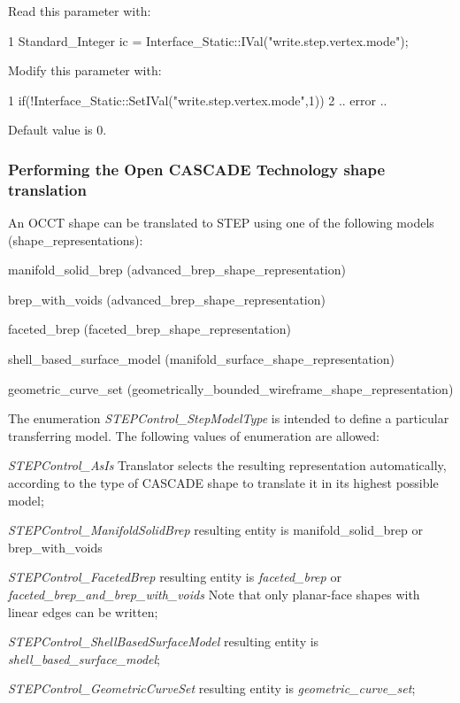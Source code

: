Read this parameter with\+: 
\begin{DoxyCode}
1 Standard\_Integer ic = Interface\_Static::IVal("write.step.vertex.mode"); 
\end{DoxyCode}
 Modify this parameter with\+: 
\begin{DoxyCode}
1 if(!Interface\_Static::SetIVal("write.step.vertex.mode",1))  
2 .. error .. 
\end{DoxyCode}
 Default value is 0.\hypertarget{occt_user_guides__step_occt_step_3_3_3}{}\subsubsection{Performing the Open C\+A\+S\+C\+A\+D\+E Technology shape translation}\label{occt_user_guides__step_occt_step_3_3_3}
An O\+C\+CT shape can be translated to S\+T\+EP using one of the following models (shape\+\_\+representations)\+:
\begin{DoxyItemize}
\item manifold\+\_\+solid\+\_\+brep (advanced\+\_\+brep\+\_\+shape\+\_\+representation)
\item brep\+\_\+with\+\_\+voids (advanced\+\_\+brep\+\_\+shape\+\_\+representation)
\item faceted\+\_\+brep (faceted\+\_\+brep\+\_\+shape\+\_\+representation)
\item shell\+\_\+based\+\_\+surface\+\_\+model (manifold\+\_\+surface\+\_\+shape\+\_\+representation)
\item geometric\+\_\+curve\+\_\+set (geometrically\+\_\+bounded\+\_\+wireframe\+\_\+shape\+\_\+representation)
\end{DoxyItemize}

The enumeration {\itshape S\+T\+E\+P\+Control\+\_\+\+Step\+Model\+Type} is intended to define a particular transferring model. The following values of enumeration are allowed\+:
\begin{DoxyItemize}
\item {\itshape S\+T\+E\+P\+Control\+\_\+\+As\+Is} Translator selects the resulting representation automatically, according to the type of C\+A\+S\+C\+A\+DE shape to translate it in its highest possible model;
\item {\itshape S\+T\+E\+P\+Control\+\_\+\+Manifold\+Solid\+Brep} resulting entity is manifold\+\_\+solid\+\_\+brep or brep\+\_\+with\+\_\+voids
\item {\itshape S\+T\+E\+P\+Control\+\_\+\+Faceted\+Brep} resulting entity is {\itshape faceted\+\_\+brep} or {\itshape faceted\+\_\+brep\+\_\+and\+\_\+brep\+\_\+with\+\_\+voids} Note that only planar-\/face shapes with linear edges can be written;
\item {\itshape S\+T\+E\+P\+Control\+\_\+\+Shell\+Based\+Surface\+Model} resulting entity is {\itshape shell\+\_\+based\+\_\+surface\+\_\+model};
\item {\itshape S\+T\+E\+P\+Control\+\_\+\+Geometric\+Curve\+Set} resulting entity is {\itshape geometric\+\_\+curve\+\_\+set};
\end{DoxyItemize}


